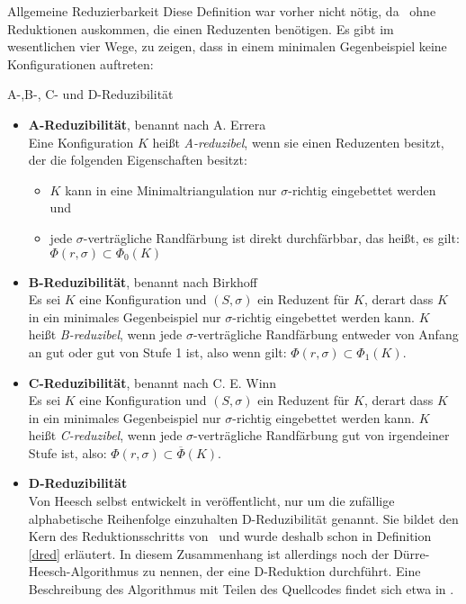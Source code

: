\begin{section}{Allgemeine Reduzierbarkeit}
 Diese Definition war vorher nicht nötig, da \rsst\-\ ohne Reduktionen auskommen, die einen Reduzenten benötigen. Es gibt im wesentlichen vier Wege, zu zeigen, dass in einem minimalen Gegenbeispiel keine Konfigurationen auftreten:
 
 \begin{definition}{A-,B-, C- und D-Reduzibilität}
 \-\ 
  \begin{itemize}
   \item \textbf{A-Reduzibilität}, benannt nach A. Errera\\
   Eine Konfiguration $K$ heißt \textit{A-reduzibel}, wenn sie einen Reduzenten besitzt, der die folgenden Eigenschaften besitzt:
   \begin{itemize}
    \item $K$ kann in eine Minimaltriangulation nur $\sigma$-richtig eingebettet werden und
    \item jede $\sigma$-verträgliche Randfärbung ist direkt durchfärbbar, das heißt, es gilt: $\Phi(r,\sigma) \subset \Phi_0(K)$
   \end{itemize}
   \item \textbf{B-Reduzibilität}, benannt nach Birkhoff\\
   Es sei $K$ eine Konfiguration und $(S,\sigma)$ ein Reduzent für $K$, derart dass $K$ in ein minimales Gegenbeispiel nur $\sigma$-richtig eingebettet werden kann. $K$ heißt \textit{B-reduzibel}, wenn jede $\sigma$-verträgliche Randfärbung entweder von Anfang an gut oder gut von Stufe 1 ist, also wenn gilt: $\Phi(r,\sigma)\subset\Phi_1(K)$.
   \item \textbf{C-Reduzibilität}, benannt nach C. E. Winn\\
   Es sei $K$ eine Konfiguration und $(S,\sigma)$ ein Reduzent für $K$, derart dass $K$ in ein minimales Gegenbeispiel nur $\sigma$-richtig eingebettet werden kann. $K$ heißt \textit{C-reduzibel}, wenn jede $\sigma$-verträgliche Randfärbung gut von irgendeiner Stufe ist, also: $\Phi(r,\sigma) \subset \overline{\Phi}(K)$.
   \item \textbf{D-Reduzibilität}\\
   Von Heesch selbst entwickelt in \cite{heesch} veröffentlicht, nur um die zufällige alphabetische Reihenfolge einzuhalten D-Reduzibilität genannt. Sie bildet den Kern  des Reduktionsschritts von \rsst\-\ und wurde deshalb schon in Definition \ref{dred} erläutert. In diesem Zusammenhang ist allerdings noch der Dürre-Heesch-Algorithmus zu nennen, der eine D-Reduktion durchführt. Eine Beschreibung des Algorithmus mit Teilen des Quellcodes findet sich etwa in \cite[Kapitel 6.4]{fritsch}.
  \end{itemize}
 \end{definition}


\end{section}

